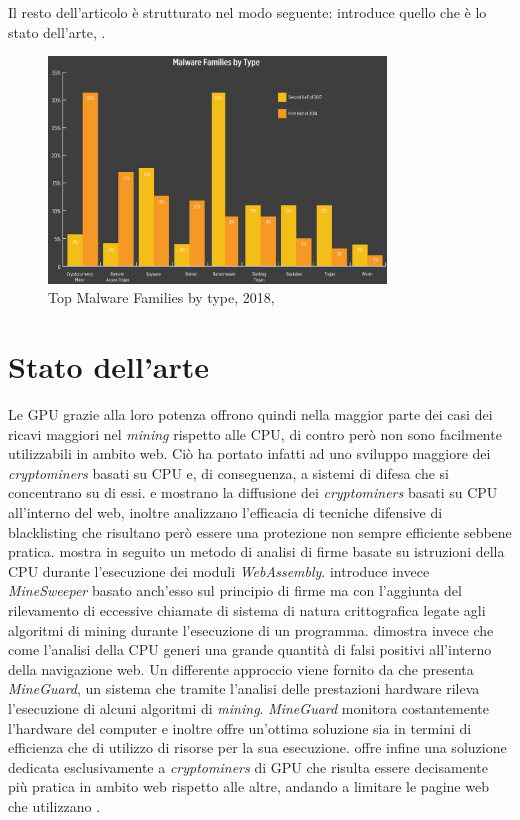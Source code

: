 \documentclass[conference, italian]{IEEEtran}
\newcommand\citen[1]{\citeauthor{#1} \citep{#1}}
\newcommand\citetitlen[1]{\citetitle{#1} \citep{#1}}
\begin{document}
Il resto dell'articolo è strutturato nel modo seguente:  introduce quello che è lo stato dell'arte, .


\begin{figure}[hbt!]
\centering
\includegraphics[width=0.8\textwidth]{TopMalwareFamilies.png}
\caption{Top Malware Families by type, 2018, \citetitlen{skyboxtrends}}\label{fig:topmalwarefamilies}
\end{figure}


\section{Stato dell'arte}\label{sec:related-work}
Le GPU grazie alla loro potenza offrono quindi nella maggior parte dei casi dei ricavi maggiori nel \emph{mining} rispetto alle CPU, di contro però non sono facilmente utilizzabili in ambito web. Ciò ha portato infatti ad uno sviluppo maggiore dei \emph{cryptominers} basati su CPU e, di conseguenza, a sistemi di difesa che si concentrano su di essi. \citen{musch2018web} e \citen{saad2018end} mostrano la diffusione dei \emph{cryptominers} basati su CPU all'interno del web, inoltre analizzano l'efficacia di tecniche difensive di blacklisting che risultano però essere una protezione non sempre efficiente sebbene pratica. \citen{wang2018seismic} mostra in seguito un metodo di analisi di firme basate su istruzioni della CPU durante l'esecuzione dei moduli \emph{WebAssembly}. \citen{konoth2018minesweeper} introduce invece \emph{MineSweeper} basato anch'esso sul principio di firme ma con l'aggiunta del rilevamento di eccessive chiamate di sistema di natura crittografica legate agli algoritmi di mining durante l'esecuzione di un programma. \citen{kharraz2019outguard} dimostra invece che come l'analisi della CPU generi una grande quantità di falsi positivi all'interno della navigazione web. Un differente approccio viene fornito da \citen{tahir2017mining} che presenta \emph{MineGuard}, un sistema che tramite l'analisi delle prestazioni hardware rileva l'esecuzione di alcuni algoritmi di \emph{mining}. \emph{MineGuard} monitora costantemente l'hardware del computer e inoltre offre un'ottima soluzione sia in termini di efficienza che di utilizzo di risorse per la sua esecuzione. \citen{belkin2019risks} offre infine una soluzione dedicata esclusivamente a \emph{cryptominers} di GPU che risulta essere decisamente più pratica in ambito web rispetto alle altre, andando a limitare le pagine web che utilizzano \citetitlen{WebGL}.
\end{document}
